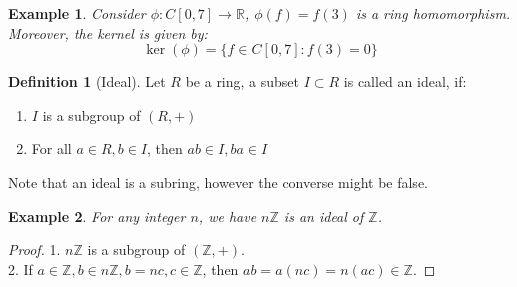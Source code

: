 \documentclass{article}
\theoremstyle{MyNonumberplain}
\theoremstyle{break}
\newtheorem*{proof}{Proof. }
\theoremstyle{break}
\newtheorem{example}{Example}[section]
\theoremstyle{break}
\theoremstyle{definition}
\theoremstyle{break}
\newtheorem{definition}{Definition}[section]
\begin{document}
\begin{expbox}
    \begin{example}
        Consider $\phi : C [0, 7] \rightarrow \mathbb{R}$, $\phi (f) = f (3)$ is a
        ring homomorphism. Moreover, the kernel is given by:
        \[ \ker (\phi) = \{ f \in C [0, 7] : f (3) = 0 \} \]
    \end{example}
\end{expbox}

\begin{defbox}
    \begin{definition}[Ideal]
        Let $R$ be a ring, a subset $I \subset R$ is called an ideal, if:\\
        \begin{enumerate}
          \item $I$ is a subgroup of $(R, +)$\\
          
          \item For all $a \in R, b \in I$, then $a b \in I, b a \in I$\\
        \end{enumerate}
        Note that an ideal is a subring, however the converse might be false.
    \end{definition}
\end{defbox}

\begin{expbox}
    \begin{example}
        For any integer $n$, we have $n\mathbb{Z}$ is an ideal of $\mathbb{Z}$.
    \end{example}
    \begin{prfbox}
        \begin{proof}
            1. $n\mathbb{Z}$ is a subgroup of $(\mathbb{Z}, +)$.\\

            2. If $a \in \mathbb{Z}, b \in n\mathbb{Z}, b = n c, c \in \mathbb{Z}$, then
            $a b = a (n c) = n (a c) \in \mathbb{Z}$.
        \end{proof}
    \end{prfbox}
\end{expbox}
\end{document}
